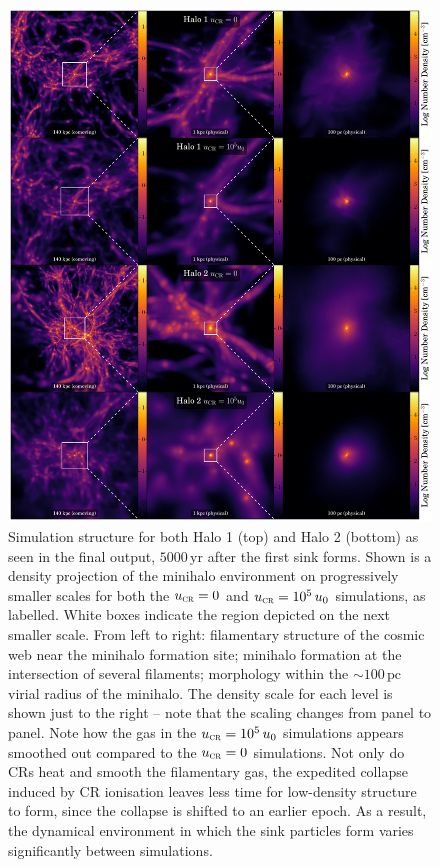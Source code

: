 \documentclass{thesis}
\newcommand{\pc}{\ensuremath{\,\mathrm{pc}}\xspace}
\newcommand{\yr}{\ensuremath{\,\mathrm{yr}}\xspace}
\newcommand{\ucr}{\ensuremath{{u}_{\textsc{cr}}}\xspace}
\begin{document}
\begin{figure}
\begin{center}
\includegraphics[width=\columnwidth]{figures/structure/structure}
\caption{\label{fig:structure}
Simulation structure for both Halo 1 (top) and Halo 2 (bottom) as seen in the final output, $5000\yr$ after the first sink forms.  
Shown is a density projection of the minihalo environment on progressively smaller scales for both the $\ucr=0$ and $\ucr=10^5\,u_0$ simulations, as labelled.  
White boxes indicate the region depicted on the next smaller scale.  
From left to right: filamentary structure of the cosmic web near the minihalo formation site; minihalo formation at the intersection of several filaments; morphology within the $\sim$$100\pc$ virial radius of the minihalo. 
The density scale for each level is shown just to the right -- note that the scaling changes from panel to panel.
Note how the gas in the $\ucr=10^5\,u_0$ simulations appears smoothed out compared to the $\ucr=0$ simulations.  
Not only do CRs heat and smooth the filamentary gas, the expedited collapse induced by CR ionisation leaves less time for low-density structure to form, since the collapse is shifted to an earlier epoch.  
As a result, the dynamical environment in which the sink particles form varies significantly between simulations.%
}
\end{center}
\end{figure}
\end{document}
